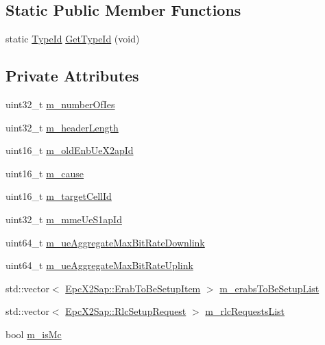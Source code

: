 \subsection*{Static Public Member Functions}
\begin{DoxyCompactItemize}
\item 
static \hyperlink{classns3_1_1TypeId}{Type\+Id} \hyperlink{classns3_1_1EpcX2HandoverRequestHeader_a3267d29656bb255c3ffeecd5e35495a3}{Get\+Type\+Id} (void)
\end{DoxyCompactItemize}
\subsection*{Private Attributes}
\begin{DoxyCompactItemize}
\item 
uint32\+\_\+t \hyperlink{classns3_1_1EpcX2HandoverRequestHeader_a7888e6bf90c8f00712a683bc28c513aa}{m\+\_\+number\+Of\+Ies}
\item 
uint32\+\_\+t \hyperlink{classns3_1_1EpcX2HandoverRequestHeader_a4b119b64b283c261afa23ca597627a03}{m\+\_\+header\+Length}
\item 
uint16\+\_\+t \hyperlink{classns3_1_1EpcX2HandoverRequestHeader_ab561fa0398d95bd851a5fe6c619679f0}{m\+\_\+old\+Enb\+Ue\+X2ap\+Id}
\item 
uint16\+\_\+t \hyperlink{classns3_1_1EpcX2HandoverRequestHeader_a6d77424810dfac9f9e2a3c101994f0d7}{m\+\_\+cause}
\item 
uint16\+\_\+t \hyperlink{classns3_1_1EpcX2HandoverRequestHeader_aa146eb52b19271b8d5dc1d497d7dedf6}{m\+\_\+target\+Cell\+Id}
\item 
uint32\+\_\+t \hyperlink{classns3_1_1EpcX2HandoverRequestHeader_a1aeefbd88fbfa59cbcf23f80f9bf231b}{m\+\_\+mme\+Ue\+S1ap\+Id}
\item 
uint64\+\_\+t \hyperlink{classns3_1_1EpcX2HandoverRequestHeader_aebe77ff780afed71a9723a06cf07b83f}{m\+\_\+ue\+Aggregate\+Max\+Bit\+Rate\+Downlink}
\item 
uint64\+\_\+t \hyperlink{classns3_1_1EpcX2HandoverRequestHeader_a3e0ee6a533a2b73117d0a154670115a4}{m\+\_\+ue\+Aggregate\+Max\+Bit\+Rate\+Uplink}
\item 
std\+::vector$<$ \hyperlink{structns3_1_1EpcX2Sap_1_1ErabToBeSetupItem}{Epc\+X2\+Sap\+::\+Erab\+To\+Be\+Setup\+Item} $>$ \hyperlink{classns3_1_1EpcX2HandoverRequestHeader_a201338ba8572bf4c8b88e5bc79ba1153}{m\+\_\+erabs\+To\+Be\+Setup\+List}
\item 
std\+::vector$<$ \hyperlink{structns3_1_1EpcX2Sap_1_1RlcSetupRequest}{Epc\+X2\+Sap\+::\+Rlc\+Setup\+Request} $>$ \hyperlink{classns3_1_1EpcX2HandoverRequestHeader_ac480cbca8380b8667096efeac4e2fa0c}{m\+\_\+rlc\+Requests\+List}
\item 
bool \hyperlink{classns3_1_1EpcX2HandoverRequestHeader_a2195d578c9065fa66c045243eeeed7c7}{m\+\_\+is\+Mc}
\end{DoxyCompactItemize}
